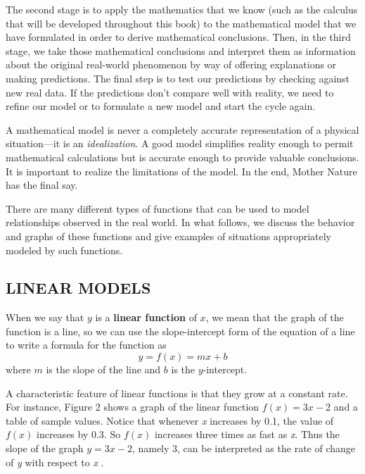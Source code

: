 \documentclass{sebase}
\begin{document}
The second stage is to apply the mathematics that we know (such as the
calculus that will be developed throughout this book) to the mathematical
model that we have formulated in order to derive mathematical conclusions.
Then, in the third stage, we take those mathematical conclusions and
interpret them as information about the origi\-nal real-world phenomenon by
way of offering explanations or making predictions. The final step is to
test our predictions by checking against new real data. If the predictions
don't compare well with reality, we need to refine our model or to formulate
a new model and start the cycle again.

A mathematical model is never a completely accurate representation of a
physical situation---it is an \textit{idealization}. A good model simplifies
reality enough to permit mathematical calculations but is accurate enough to
provide valuable conclusions. It is important to realize the limitations of
the model. In the end, Mother Nature has the final say.

There are many different types of functions that can be used to model
relationships observed in the real world. In what follows, we discuss the
behavior and graphs of these functions and give examples of situations
appropriately modeled by such functions.%
\enlargethispage{\baselineskip}%

\subsection{LINEAR MODELS}

When we say that $y$ is a \textbf{linear function} of $x$, 
we mean that the
graph of the function is a line, so we can use the slope-intercept form of
the equation of a line to write a formula for the function as 
\begin{equation*}
y=f(x)=mx+b
\end{equation*}
where $m$ is the slope of the line and $b$ is the $y$-intercept.

A characteristic feature of linear functions is that they grow at a constant
rate. For instance, Figure 2 shows a graph of the linear function $f(x)=3x-2$
and a table of sample values. Notice that whenever \textit{x} increases by
0.1, the value of $f(x)$ increases by 0.3. So $f(x)$ increases three times
as fast as \textit{x}. Thus the slope of the graph $y=3x-2$, namely 3, can
be interpreted as the rate of change of \textit{y} with respect to \textit{x}%
.\bigskip
\end{document}
